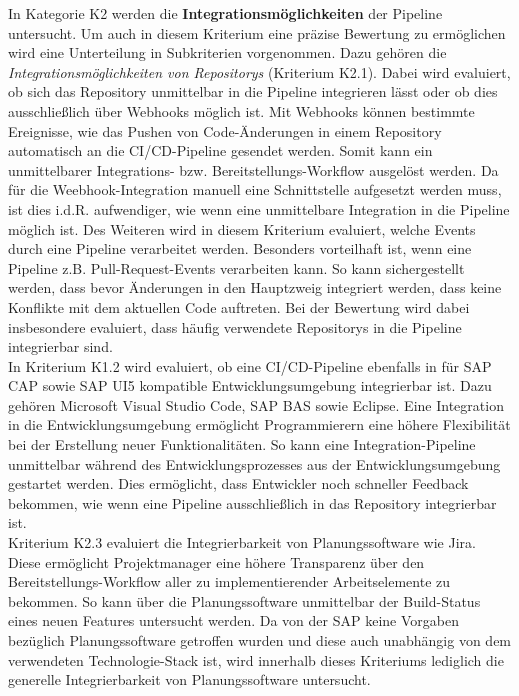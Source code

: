 In Kategorie K2 werden die \textbf{Integrationsmöglichkeiten} der Pipeline untersucht. Um auch in diesem Kriterium eine präzise Bewertung zu ermöglichen wird eine Unterteilung in Subkriterien vorgenommen. Dazu gehören die \textit{Integrationsmöglichkeiten von Repositorys} (Kriterium K2.1). Dabei wird evaluiert, ob sich das Repository unmittelbar in die Pipeline integrieren lässt oder ob dies ausschließlich über Webhooks möglich ist. Mit Webhooks können bestimmte Ereignisse, wie das Pushen von Code-Änderungen in einem Repository automatisch an die CI/CD-Pipeline gesendet werden. Somit kann ein unmittelbarer Integrations- bzw. Bereitstellungs-Workflow ausgelöst werden. Da für die Weebhook-Integration manuell eine Schnittstelle aufgesetzt werden muss, ist dies i.d.R. aufwendiger, wie wenn eine unmittelbare Integration in die Pipeline möglich ist. Des Weiteren wird in diesem Kriterium evaluiert, welche Events durch eine Pipeline verarbeitet werden. Besonders vorteilhaft ist, wenn eine Pipeline z.B. Pull-Request-Events verarbeiten kann. So kann sichergestellt werden, dass bevor Änderungen in den Hauptzweig integriert werden, dass keine Konflikte mit dem aktuellen Code auftreten. Bei der Bewertung wird dabei insbesondere evaluiert, dass häufig verwendete Repositorys in die Pipeline integrierbar sind. \\ In Kriterium K1.2 wird evaluiert, ob eine CI/CD-Pipeline ebenfalls in für SAP CAP sowie SAP UI5 kompatible Entwicklungsumgebung integrierbar ist. Dazu gehören Microsoft Visual Studio Code, \ac{SAP BAS} sowie Eclipse. Eine Integration in die Entwicklungsumgebung ermöglicht Programmierern eine höhere Flexibilität bei der Erstellung neuer Funktionalitäten. So kann eine Integration-Pipeline unmittelbar während des Entwicklungsprozesses aus der Entwicklungsumgebung gestartet werden. Dies ermöglicht, dass Entwickler noch schneller Feedback bekommen, wie wenn eine Pipeline ausschließlich in das Repository integrierbar ist.\\
Kriterium K2.3 evaluiert die Integrierbarkeit von Planungssoftware wie Jira. Diese ermöglicht Projektmanager eine höhere Transparenz über den Bereitstellungs-Workflow aller zu implementierender Arbeitselemente zu bekommen. So kann über die Planungssoftware unmittelbar der Build-Status eines neuen Features untersucht werden. Da von der SAP keine Vorgaben bezüglich Planungssoftware getroffen wurden und diese auch unabhängig von dem verwendeten Technologie-Stack ist, wird innerhalb dieses Kriteriums lediglich die generelle Integrierbarkeit von Planungssoftware untersucht.\\ 

